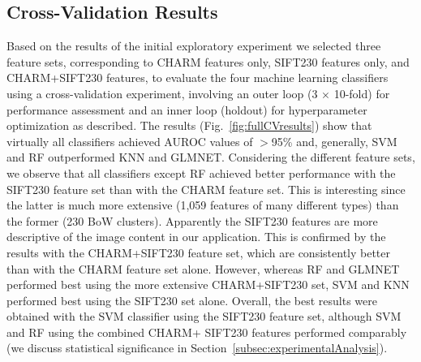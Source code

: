 \subsection{Cross-Validation Results}
\label{subsec:baselineResults}

Based on the results of the initial exploratory experiment we selected {\color{red}three feature sets, corresponding to CHARM features only, SIFT230 features only, and CHARM+SIFT230 features,} to evaluate the four machine learning classifiers using a cross-validation experiment, involving an outer loop (3 $\times$ 10-fold) for performance assessment and an inner loop (holdout) for hyperparameter optimization as described. The results (Fig.~\ref{fig:fullCVresults}) show that virtually all classifiers achieved AUROC values of $>$95\% and, generally, SVM and RF outperformed KNN and GLMNET. Considering the different feature sets, we observe that all classifiers except RF achieved better performance with the SIFT230 feature set than with the CHARM feature set. This is interesting since the latter is much more extensive (1,059 features of many different types) than the former (230 BoW clusters). Apparently the SIFT230 features are more descriptive of the image content in our application. This is confirmed by the results with the CHARM+SIFT230 feature set, which are consistently better than with the CHARM feature set alone. However, whereas RF and GLMNET performed best using the more extensive CHARM+SIFT230 set, SVM and KNN performed best using the SIFT230 set alone. Overall, the best results were obtained with the SVM classifier using the SIFT230 feature set, although SVM and RF using the combined CHARM+ SIFT230 features performed comparably (we discuss statistical significance in Section~\ref{subsec:experimentalAnalysis}).

